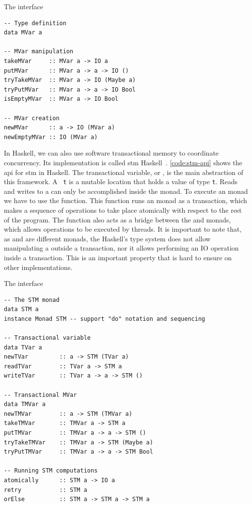 \begin{listing}
  \caption{The \MVar interface}
  \begin{verbatim}
-- Type definition
data MVar a

-- MVar manipulation
takeMVar     :: MVar a -> IO a
putMVar      :: MVar a -> a -> IO ()
tryTakeMVar  :: MVar a -> IO (Maybe a)
tryPutMVar   :: MVar a -> a -> IO Bool
isEmptyMVar  :: MVar a -> IO Bool

-- MVar creation
newMVar      :: a -> IO (MVar a)
newEmptyMVar :: IO (MVar a)
  \end{verbatim}
  \label{code:mvar-api}
\end{listing}

In Haskell, we can also use software transactional memory to coordinate concurrency. Its implementation is called \acs{stm} Haskell~\cite{harris:2005}. \autoref{code:stm-api} shows the \acs{api} for \acs{stm} in Haskell. The transactional variable, or \TVar, is the main abstraction of this framework. A \TVar~\texttt{t} is a mutable location that holds a value of type \texttt{t}. Reads and writes to a \TVar can only be accomplished inside the \STM monad. To execute an \STM monad we have to use the \atomically function. This function runs an \STM monad as a transaction, which makes a sequence of operations to take place atomically with respect to the rest of the program. The \atomically function also acts as a bridge between the \IO and \STM monads, which allows \STM operations to be executed by threads. It is important to note that, as \STM and \IO are different monads, the Haskell's type system does not allow manipulating a \TVar outside a transaction, nor it allows performing an IO operation inside a transaction. This is an important property that is hard to ensure on other \STM implementations.

\begin{listing}
  \caption{The \STM interface}
  \begin{verbatim}
-- The STM monad
data STM a
instance Monad STM -- support "do" notation and sequencing

-- Transactional variable
data TVar a
newTVar         :: a -> STM (TVar a)
readTVar        :: TVar a -> STM a
writeTVar       :: TVar a -> a -> STM ()

-- Transactional MVar
data TMVar a
newTMVar        :: a -> STM (TMVar a)
takeTMVar       :: TMVar a -> STM a
putTMVar        :: TMVar a -> a -> STM ()
tryTakeTMVar    :: TMVar a -> STM (Maybe a)
tryPutTMVar     :: TMVar a -> a -> STM Bool

-- Running STM computations
atomically      :: STM a -> IO a
retry           :: STM a
orElse          :: STM a -> STM a -> STM a
  \end{verbatim}
  \label{code:stm-api}
\end{listing}

